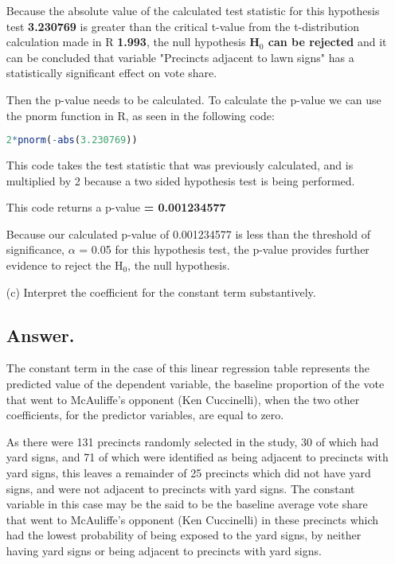 \documentclass[12pt,letterpaper]{article}
\begin{document}
\begin{enumerate}
	\vspace{0.1cm}
	
	Because the absolute value of the calculated test statistic for this hypothesis test \textbf{3.230769} is greater than the critical t-value from the t-distribution calculation made in R \textbf{1.993}, the null hypothesis \textbf{H$_0$ can be rejected} and it can be concluded that variable "Precincts adjacent to lawn signs" has a statistically significant effect on vote share.
	
	\vspace{0.1cm}
	
	Then the p-value needs to be calculated. To calculate the p-value we can use the pnorm function in R, as seen in the following code:
	
	\begin{lstlisting}[language=R]
	2*pnorm(-abs(3.230769))
	\end{lstlisting}
	
	This code takes the test statistic that was previously calculated, and is multiplied by 2 because a two sided hypothesis test is being performed.
	
	\vspace{0.1cm}
	
	This code returns a p-value \textbf{= 0.001234577}
	
	Because our calculated p-value of 0.001234577 is less than the threshold of significance, $\alpha$ = 0.05 for this hypothesis test, the p-value provides further evidence to reject the H$_0$, the null hypothesis.
	\vspace{1cm}
	\item [(c)] Interpret the coefficient for the constant term substantively.
	\subsection*{Answer.}
	
	The constant term in the case of this linear regression table represents the predicted value of the dependent variable, the baseline proportion of the vote that went to McAuliffe's opponent (Ken Cuccinelli), when the two other coefficients, for the predictor variables, are equal to zero.
	
	As there were 131 precincts randomly selected in the study, 30 of which had yard signs, and 71 of which were identified as being adjacent to precincts with yard signs, this leaves a remainder of 25 precincts which did not have yard signs, and were not adjacent to precincts with yard signs. The constant variable in this case may be the said to be the baseline average vote share that went to McAuliffe's opponent (Ken Cuccinelli) in these precincts which had the lowest probability of being exposed to the yard signs, by neither having yard signs or being adjacent to precincts with yard signs.
	\vspace{7cm}
	

\end{enumerate}
\end{document}
